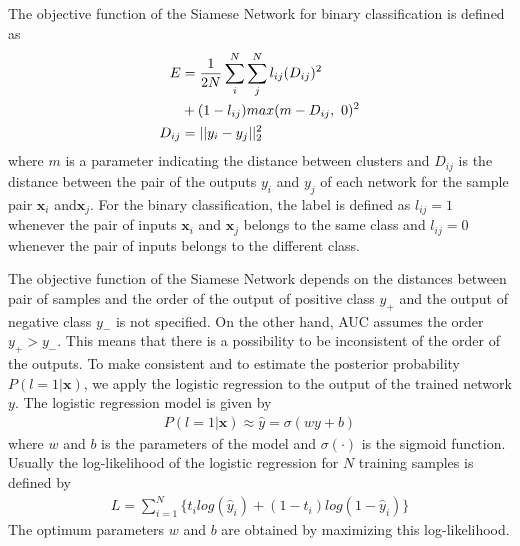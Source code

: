 \documentclass[twocolumn,10pt]{article}
\begin{document}
The objective function of the Siamese Network for binary classification is defined as
\begin{align} \label{eq:siamese-loss}
E&=\frac{1}{2N}\sum_i^N \sum_j^N l_{ij}(D_{ij})^2 \notag \\
&+ (1-l_{ij})max(m-D_{ij}, ~0)^2 \\
D_{ij}&=||y_{i}- y_{j}||^2_2
\label{eq:siamese-dis}
\end{align}
where $m$ is a parameter indicating the distance between clusters and 
$D_{ij}$ is the distance between the pair of the outputs $y_i$ and $y_j$ of each network for the sample pair $\bm{x}_i$ and$\bm{x}_j$.
For the binary classification, the label is defined as $l_{ij}=1$ whenever the pair of inputs ${\bm x_i}$ and ${\bm x_j}$ belongs to the same class and $l_{ij}=0$ whenever the pair of inputs belongs to the different class.



The objective function of the Siamese Network depends on the distances between pair of samples and the order of the output of positive class $y_+$ and the output of negative class $y_-$ is not specified.
On the other hand, AUC assumes the order $y_+ > y_-$.
This means that there is a possibility to be inconsistent of the order of the outputs.
To make consistent and to estimate the posterior probability $P(l=1|\bm{x})$, we apply the logistic regression to the output of the trained network $y$. 
The logistic regression model is given by
\begin{align} \label{eq:regression}
    P(l=1|\bm{x}) \approx \hat{y} = \sigma(w y+b)
\end{align}
where $w$ and $b$ is the parameters of the model and $\sigma(\cdot)$ is the sigmoid function.
Usually the log-likelihood of the logistic regression for $N$ training samples is defined by
\begin{align} \label{eq:crossentropy}
    L = \sum_{i=1}^N \{ t_i log(\hat{y}_i) + (1-t_i) log(1-\hat{y}_i) \}
\end{align}
The optimum parameters $w$ and $b$ are obtained by maximizing this log-likelihood.
\end{document}
